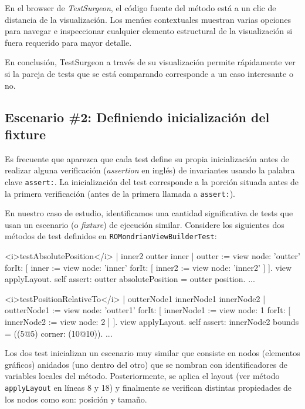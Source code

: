 \par En el browser de \emph{TestSurgeon}, el código fuente del método está a un clic de distancia de la visualización. Los menúes contextuales muestran varias opciones para navegar e inspeccionar cualquier elemento estructural de la visualización si fuera requerido para mayor detalle.


\par En conclusión, TestSurgeon a través de su visualización permite rápidamente ver si la pareja de tests que se está comparando corresponde a un caso interesante o no.

\newpage
\subsection{Escenario \#2: Definiendo inicialización del fixture}

\par Es frecuente que aparezca que cada test define su propia inicialización antes de realizar alguna verificación (\emph{assertion} en inglés) de invariantes usando la palabra clave {\tt assert:}. La inicialización del test corresponde a la porción situada antes de la primera verificación (\ie antes de la primera llamada a {\tt assert:}).

\par En nuestro caso de estudio, identificamos una cantidad significativa de tests que usan un escenario (o \emph{fixture}) de ejecución similar. Considere los siguientes dos métodos de test definidos en {\tt ROMondrianViewBuilderTest}:

\begin{codeWithLineNumbers}
<i>testAbsolutePosition</i>
	| inner2 outter inner |
	outter := view node: 'outter' forIt: [
		inner := view node: 'inner' forIt: [
			inner2 := view node: 'inner2'
		]
	].
	view applyLayout.
	self assert: outter absolutePosition = outter position.
	...


<i>testPositionRelativeTo</i>
	| outterNode1 innerNode1 innerNode2 |
	outterNode1 := view node: 'outter1' forIt: 
		[ innerNode1 := view node: 1 forIt: [ 
		innerNode2 := view node: 2 ] ].
	view applyLayout.
	self assert: innerNode2 bounds = ((5@5) corner: (10@10)).
	...
\end{codeWithLineNumbers}

\par Los dos test inicializan un escenario muy similar que consiste en nodos (elementos gráficos) anidados (uno dentro del otro) que se nombran con identificadores de variables locales del método. Posteriormente, se aplica el layout (ver método {\tt applyLayout} en líneas 8 y 18) y finalmente se verifican distintas propiedades de los nodos como son: posición y tamaño.

